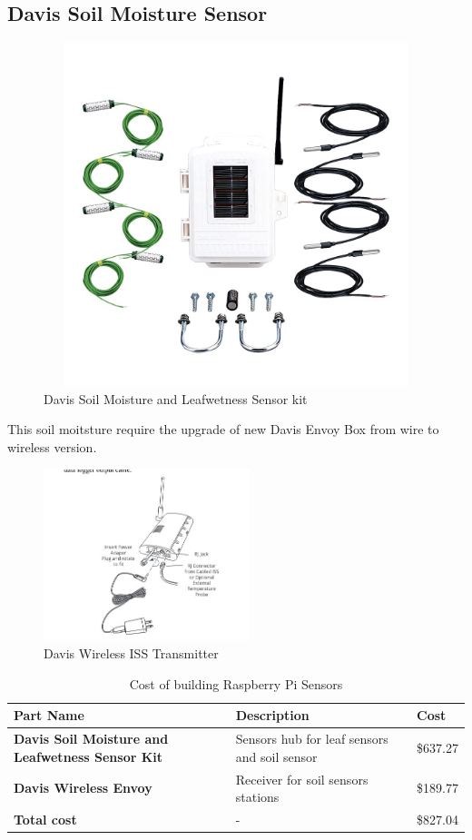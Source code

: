 \documentclass[10pt, a4paper]{article}
\begin{document}
\newpage
\subsection{Davis Soil Moisture Sensor}
\begin{figure}[!ht]
  \centering
    \includegraphics[width=1\textwidth, height=10cm]{davis-soil-moisture.jpg}
  \caption{Davis Soil Moisture and Leafwetness Sensor kit}
\end{figure}

\par This soil moitsture require the upgrade of new Davis Envoy Box from wire to wireless version.
\begin{figure}[!ht]
  \centering
    \includegraphics[width=\textwidth, height=5cm]{davis-envoy.jpg}
  \caption{Davis Wireless ISS Transmitter}
\end{figure}

\begin{table}[!ht]
    \centering
    \begin{tabular}{|l|l|l|}
    \hline
    \textbf{Part Name} & \textbf{Description} & \textbf{Cost} \\ \hline
        \textbf{Davis Soil Moisture and Leafwetness Sensor Kit} & Sensors hub for leaf sensors and soil sensor & \$637.27 \\ \hline
        \textbf{Davis Wireless Envoy} & Receiver for soil sensors stations & \$189.77 \\ \hline
	\textbf{Total cost} & - & \$827.04 \\ \hline 
    \end{tabular}
    \caption{Cost of building Raspberry Pi Sensors}
\end{table}
\end{document}

